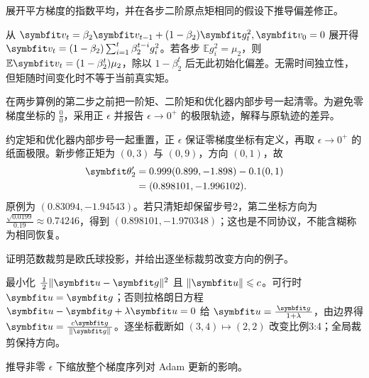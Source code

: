 
\begin{exercises}
\begin{exercise} 展开平方梯度的指数平均，并在各步二阶原点矩相同的假设下推导偏差修正。

\begin{solution}
从 $\vect{v}_t=\beta_2\vect{v}_{t-1}+(1-\beta_2)\vect{g}_t^2,\vect{v}_0=0$ 展开得 $\vect{v}_t=(1-\beta_2)\sum_{i=1}^t\beta_2^{t-i}g_i^2$。若各步 $\mathbb E g_i^2=\mu_2$，则 $\mathbb E\vect{v}_t=(1-\beta_2^t)\mu_2$，除以 $1-\beta_2^t$ 后无此初始化偏差。无需时间独立性，但矩随时间变化时不等于当前真实矩。
\end{solution}
\end{exercise}

\begin{exercise} 在两步算例的第二步之前把一阶矩、二阶矩和优化器内部步号一起清零。为避免零梯度坐标的 $\frac{0}{0}$，采用正 $\epsilon$ 并报告 $\epsilon\to0^+$ 的极限轨迹，解释与原轨迹的差异。

\begin{solution}
约定矩和优化器内部步号一起重置，正 $\epsilon$ 保证零梯度坐标有定义，再取 $\epsilon\to0^+$ 的纸面极限。新步修正矩为 $(0,3)$ 与 $(0,9)$，方向 $(0,1)$，故
\[
\begin{aligned}
\vect{\theta}_2'&=0.999(0.899,-1.898)-0.1(0,1)\\
         &=(0.898101,-1.996102).
\end{aligned}
\]
原例为 $(0.83094,-1.94543)$。若只清矩却保留步号2，第二坐标方向为 $\frac{\sqrt{0.0199}}{0.19}\approx0.74246$，得到 $(0.898101,-1.970348)$；这也是不同协议，不能含糊称为相同恢复。
\end{solution}
\end{exercise}

\begin{exercise} 证明范数裁剪是欧氏球投影，并给出逐坐标裁剪改变方向的例子。

\begin{solution}
最小化 $\frac12\|\vect{u}-\vect{g}\|^2$ 且 $\|\vect{u}\|\le c$。可行时 $\vect{u}=\vect{g}$；否则拉格朗日方程 $\vect{u}-\vect{g}+\lambda \vect{u}=0$ 给 $\vect{u}=\frac{\vect{g}}{1+\lambda}$，由边界得 $\vect{u}=\frac{c\vect{g}}{\|\vect{g}\|}$。逐坐标截断如 $(3,4)\mapsto(2,2)$ 改变比例3:4；全局裁剪保持方向。
\end{solution}
\end{exercise}

\begin{exercise}\optional 推导非零 $\epsilon$ 下缩放整个梯度序列对 Adam 更新的影响。


\end{exercise}
\end{exercises}
